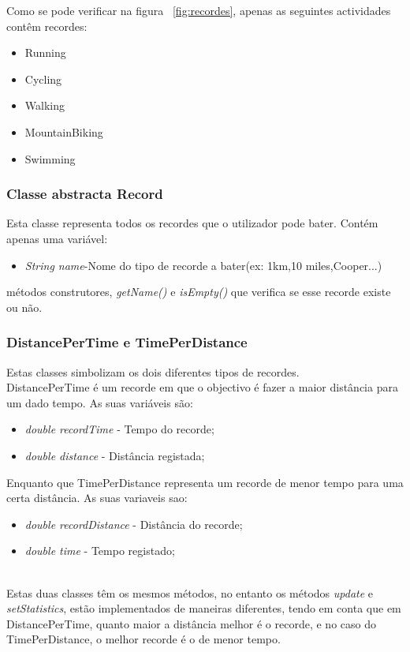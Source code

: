 \documentclass[12pt,notitlepage]{article}
\begin{document}
Como se pode verificar na figura ~\ref{fig:recordes}, apenas as seguintes actividades contêm recordes:
\begin{itemize}
\item Running
\item Cycling
\item Walking
\item MountainBiking
\item Swimming
\end{itemize}


\subsubsection{Classe abstracta Record}

Esta classe representa todos os recordes que o utilizador pode bater. Contém apenas uma variável:
\begin{itemize}
\item \textit{String name}-Nome do tipo de recorde a bater(ex: 1km,10 miles,Cooper...)
\end{itemize}
métodos construtores, \textit{getName()} e \textit{isEmpty()} que verifica se esse recorde existe ou não.


\subsubsection{DistancePerTime e TimePerDistance}
Estas classes simbolizam os dois diferentes tipos de recordes.\\

DistancePerTime é um recorde em que o objectivo é fazer a maior distância para um dado tempo.
As suas variáveis são:
\begin{itemize}
\item \textit{double recordTime} - Tempo do recorde;
\item \textit{double distance} - Distância registada;
\end{itemize}
Enquanto que TimePerDistance representa um recorde de menor tempo para uma certa distância.
As suas variaveis sao:
\begin{itemize}
\item \textit{double recordDistance} - Distância do recorde;
\item \textit{double time} - Tempo registado;
\end{itemize}
~\\
Estas duas classes têm os mesmos métodos, no entanto os métodos \textit{update} e \textit{setStatistics}, estão implementados de maneiras diferentes, tendo em conta que em DistancePerTime, quanto maior a distância melhor é o recorde, e no caso do TimePerDistance,  o melhor recorde é o de menor tempo.
\end{document}
